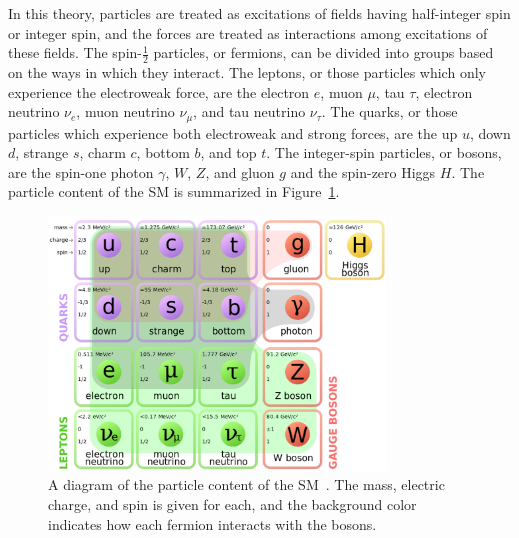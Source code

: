 In this theory, particles are treated as excitations of fields having half-integer spin or
integer spin, and the forces are treated as interactions among excitations of these fields.
The spin-$\frac{1}{2}$ particles, or fermions, can be divided into groups based on the ways
in which they interact. The leptons, or those particles which only experience the electroweak force,
are the electron $e$, muon $\mu$, tau $\tau$, electron neutrino $\nu_e$, muon neutrino $\nu_\mu$, and
tau neutrino $\nu_\tau$. The quarks, or those particles which experience both electroweak and strong
forces, are the up $u$, down $d$, strange $s$, charm $c$, bottom $b$, and top $t$. The integer-spin
particles, or bosons, are the spin-one photon $\gamma$, $W$, $Z$, and gluon $g$ and the spin-zero Higgs $H$.
The particle content of the SM is summarized in Figure~\ref{fig:SMtable}.

\begin{figure}[ht]
 \begin{center}
    \includegraphics[width=0.80\textwidth]{figures/intro/Standard_Model_of_Elementary_Particles_modified_version.pdf}
      \end{center}
\caption{A diagram of the particle content of the SM~\cite{SMdiagram}.
The mass, electric charge, and spin is given for each, and the background color indicates how each
fermion interacts with the bosons.}
\label{fig:SMtable}
\end{figure}

